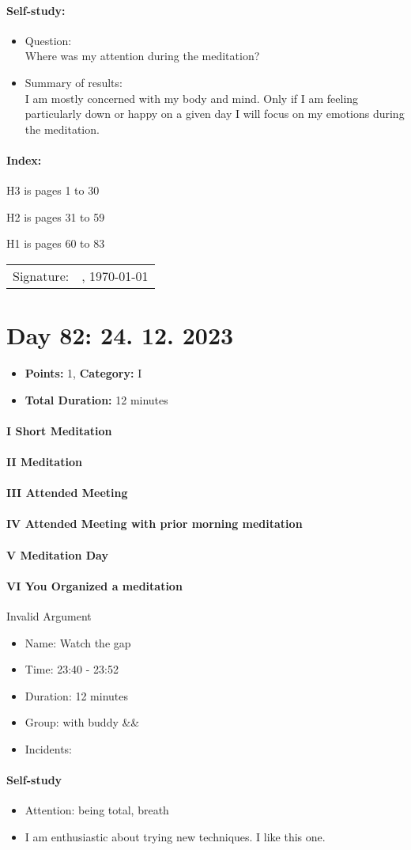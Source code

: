 \documentclass[11pt,a4paper]{article}
\newcommand*\sepstars{%
  \begin{center}
    $\star\star\star$
  \end{center}
  \newpage
}
\newcommand{\daySummary}[3]{
    \begin{itemize}[label={}]
        \item \textbf{Points:} #1, \textbf{Category:} #2
        \item \textbf{Total Duration:} #3 minutes
    \end{itemize}
    \medskip
}
\newcommand{\meditationEntry}[6]{
    \ifcase#1
        \or \paragraph{I Short Meditation}%
        \or \paragraph{II Meditation}%
        \or \paragraph{III Attended Meeting}%
        \or \paragraph{IV Attended Meeting with prior morning meditation}%
        \or \paragraph{V Meditation Day}%
        \or \paragraph{VI You Organized a meditation}%
        \else Invalid Argument%
    \fi
    \begin{itemize}[label={}]
        \item Name: #2
        \item Time: #3
        \item Duration: #4 minutes
        \item Group: #5
        \ifx&#6&%
        \else
            \item Incidents: #6
        \fi
    \end{itemize}
    \smallskip
}
\newcommand{\selfStudy}[3]{
\paragraph{Self-study}
    \begin{itemize}[label={}]
        \item Attention: #1
        \item #2
    \end{itemize}
    \medskip
}
\begin{document}

\paragraph{Self-study:}
\begin{itemize}
	\item Question:\\
	Where was my attention during the meditation?
    \item Summary of results:\\
    I am mostly concerned with my body and mind. Only if I am feeling particularly down or happy on a given day I will focus on my emotions during the meditation.
\end{itemize}

\paragraph{Index:}

H3 is pages 1 to 30

H2 is pages 31 to 59

H1 is pages 60 to 83


\vspace*{\fill}

\begin{tabular}{@{}p{.5in}p{4in}@{}}
    Signature: & \hrulefill , \today{} \\
\end{tabular}

\newpage

\section*{Day 82: 24. 12. 2023}
\daySummary{1}{I}{12}

\meditationEntry{1}{Watch the gap}{23:40 - 23:52}{12}{with buddy}{}
\selfStudy{being total, breath}{I am enthusiastic about trying new techniques. I like this one.}

\sepstars %
\end{document}
